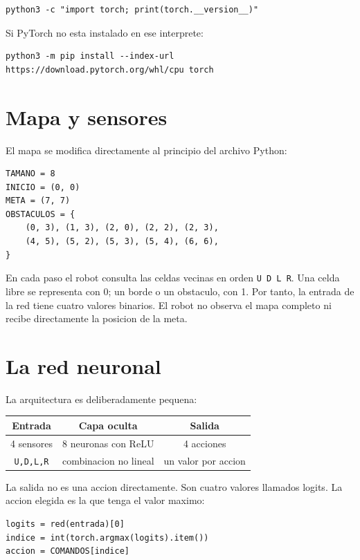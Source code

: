 \documentclass[11pt,a4paper]{article}
\begin{document}
\begin{lstlisting}[style=python]
python3 -c "import torch; print(torch.__version__)"
\end{lstlisting}

Si PyTorch no esta instalado en ese interprete:

\begin{lstlisting}[style=python]
python3 -m pip install --index-url https://download.pytorch.org/whl/cpu torch
\end{lstlisting}

\section{Mapa y sensores}
El mapa se modifica directamente al principio del archivo Python:

\begin{lstlisting}[style=python]
TAMANO = 8
INICIO = (0, 0)
META = (7, 7)
OBSTACULOS = {
    (0, 3), (1, 3), (2, 0), (2, 2), (2, 3),
    (4, 5), (5, 2), (5, 3), (5, 4), (6, 6),
}
\end{lstlisting}

En cada paso el robot consulta las celdas vecinas en orden \texttt{U D L R}. Una celda libre se representa con 0; un borde o un obstaculo, con 1. Por tanto, la entrada de la red tiene cuatro valores binarios. El robot no observa el mapa completo ni recibe directamente la posicion de la meta.

\section{La red neuronal}
La arquitectura es deliberadamente pequena:

\begin{center}
\begin{tabular}{c|c|c}
\toprule
Entrada & Capa oculta & Salida \\
\midrule
4 sensores & 8 neuronas con ReLU & 4 acciones \\
\texttt{U,D,L,R} & combinacion no lineal & un valor por accion \\
\bottomrule
\end{tabular}
\end{center}

La salida no es una accion directamente. Son cuatro valores llamados logits. La accion elegida es la que tenga el valor maximo:

\begin{lstlisting}[style=python]
logits = red(entrada)[0]
indice = int(torch.argmax(logits).item())
accion = COMANDOS[indice]
\end{lstlisting}
\end{document}
